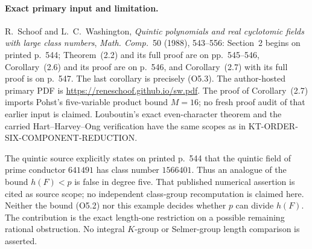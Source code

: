 \paragraph{Exact primary input and limitation.}
R.~Schoof and L.~C.~Washington, \emph{Quintic polynomials and real
cyclotomic fields with large class numbers},
\emph{Math. Comp.}~50 (1988), 543--556:
Section~2 begins on printed p.~544; Theorem~(2.2) and its full proof
are on pp.~545--546, Corollary~(2.6) and its proof are on p.~546,
and Corollary~(2.7) with its full proof is on p.~547.
The last corollary is precisely (O5.3).
The author-hosted primary PDF is
\url{https://reneschoof.github.io/sw.pdf}.
The proof of Corollary~(2.7) imports Pohst's five-variable product
bound $M=16$; no fresh proof audit of that earlier input is claimed.
Louboutin's exact even-character theorem and the carried
Hart--Harvey--Ong verification have the same scopes as in
KT-ORDER-SIX-COMPONENT-REDUCTION.

The quintic source explicitly states on printed p.~544 that the
quintic field of prime conductor $641491$ has class number $1566401$.
Thus an analogue of the bound $h(F)<p$ is false in degree five.
That published numerical assertion is cited as source scope; no
independent class-group recomputation is claimed here.
Neither the bound (O5.2) nor this example decides whether
$p$ can divide $h(F)$.  The contribution is the exact length-one
restriction on a possible remaining rational obstruction.
No integral $K$-group or Selmer-group length comparison is asserted.
